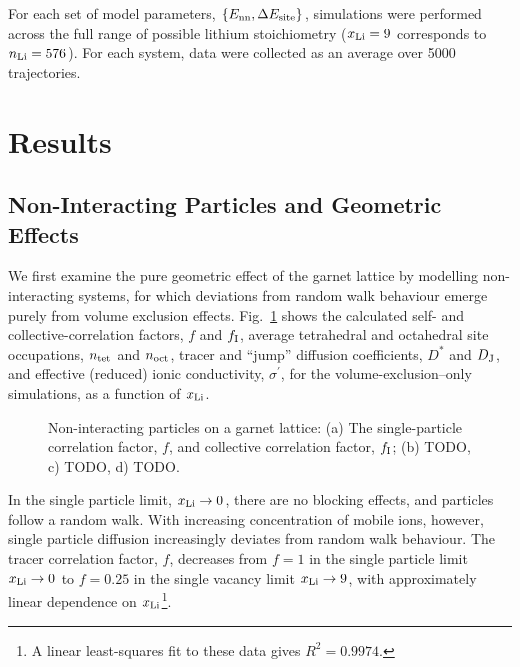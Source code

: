 \documentclass[aps,prb,twocolumn,superscriptaddress,reprint]{revtex4-1}
\newcommand{\set}[1]{\left\{#1\right\}}
\newcommand{\xLi}{x_\m{Li}}
\begin{document}
For each set of model parameters, $\set{E_\m{nn}, \Delta E_\m{site}}$, simulations were performed across the full range of possible lithium stoichiometry ($\xLi=9$ corresponds to $n_{\mathrm{Li}}=576$). 
For each system, data were collected as an average over 5000 trajectories. 

\section{Results}
\subsection{Non-Interacting Particles and Geometric Effects}
We first examine the pure geometric effect of the garnet lattice by modelling non-interacting systems, for which deviations from random walk behaviour emerge purely from volume exclusion effects. 
Fig.~\ref{fig:non-interacting_data} shows the calculated self- and collective-correlation factors, $f$ and $f_{\mathrm{I}}$, average tetrahedral and octahedral site occupations, $n_{\mathrm{tet}}$ and $n_{\mathrm{oct}}$, tracer and ``jump'' diffusion coefficients, $D^*$ and $D_{\mathrm{J}}$, and effective (reduced) ionic conductivity, $\sigma^\prime$, for the volume-exclusion--only simulations, as a function of $\xLi$.

\begin{figure}[tb]
  \centering
    \caption{\label{fig:non-interacting_data}Non-interacting particles on a garnet lattice: (a) The single-particle correlation factor, $f$, and collective correlation factor, $f_{\mathrm{I}}$; (b) TODO, c) TODO, d) TODO.}
\end{figure}

In the single particle limit, $\xLi\to0$, there are no blocking effects, and particles follow a random walk. 
With increasing concentration of mobile ions, however, single particle diffusion increasingly deviates from random walk behaviour. 
The tracer correlation factor, $f$, decreases from $f=1$ in the single particle limit $\xLi\to0$ to $f=0.25$ in the single vacancy limit $\xLi\to9$, with approximately linear dependence on $\xLi$\footnote{A linear least-squares fit to these data gives $R^2=0.9974$.}.
\end{document}
